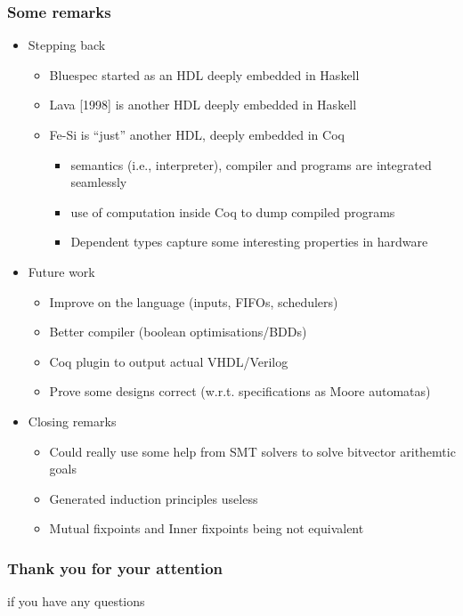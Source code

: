 \documentclass[9pt]{beamer}
\begin{document}
\begin{frame}[fragile]
  \frametitle{Some remarks}
  \begin{itemize}

  \item Stepping back
    \begin{itemize}
    \item Bluespec started as an HDL deeply embedded in Haskell
    \item Lava [1998] is another HDL deeply embedded in Haskell
    \item Fe-Si is ``just'' another HDL,  deeply embedded in \alert{Coq}
      \pause
      \begin{itemize}
      \item semantics (i.e., interpreter), compiler and programs are \alert{integrated seamlessly}
      \item use of computation \alert{inside} Coq to dump compiled programs
      \item Dependent types capture some interesting properties in hardware
      \end{itemize}
    \end{itemize}

\pause

  \item Future work
      \begin{itemize}
      \item Improve on the language (inputs, FIFOs, schedulers)
      \item Better compiler (boolean optimisations/BDDs)
      \item Coq plugin to output actual VHDL/Verilog
      \item Prove some designs correct (w.r.t. specifications as Moore automatas)
      \end{itemize}
      
\pause

    \item Closing remarks
      \begin{itemize}
      \item Could really use some help from SMT solvers to solve bitvector arithemtic goals
      \item Generated induction principles useless
      \item Mutual fixpoints and Inner fixpoints being not equivalent
      \end{itemize}
  
    \end{itemize}
\end{frame}

\begin{frame}
  \frametitle{Thank you for your attention}
  
  if you have any questions

\end{frame}
\end{document}
